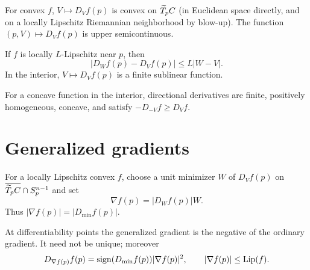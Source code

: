 \begin{lemma}
\label{lem:chow-iii-h26-directional-convexity-usc}
For convex $f$, $V\mapsto D_Vf(p)$ is convex on $\widetilde T_pC$ (in Euclidean space directly,
and on a locally Lipschitz Riemannian neighborhood by blow-up).  The function
$(p,V)\mapsto D_Vf(p)$ is upper semicontinuous.
\end{lemma}

\begin{lemma}
\label{lem:chow-iii-h27-directional-sublinear}
If $f$ is locally $L$-Lipschitz near $p$, then
\[
|D_Wf(p)-D_Vf(p)|\le L|W-V|.
\]
In the interior, $V\mapsto D_Vf(p)$ is a finite sublinear function.
\end{lemma}

\begin{remark}
\label{rem:chow-iii-h28-concave-directional-derivatives}
For a concave function in the interior, directional derivatives are finite, positively
homogeneous, concave, and satisfy $-D_{-V}f\ge D_Vf$.
\end{remark}

\section{Generalized gradients}

\begin{definition}
\label{def:chow-iii-h29-generalized-gradient}
For a locally Lipschitz convex $f$, choose a unit minimizer $W$ of $D_Vf(p)$ on
$\overline{\widetilde T_pC}\cap S_p^{n-1}$ and set
\[
\nabla f(p)=|D_Wf(p)|W.
\]
Thus $|\nabla f(p)|=|D_{\min}f(p)|$.
\end{definition}

\begin{lemma}
\label{lem:chow-iii-h30-generalized-gradient-properties}
At differentiability points the generalized gradient is the negative of the ordinary
gradient.  It need not be unique; moreover
\[
D_{\nabla f(p)}f(p)=\operatorname{sign}(D_{\min}f(p))|\nabla f(p)|^2,
\qquad |\nabla f(p)|\le\operatorname{Lip}(f).
\]
\end{lemma}

